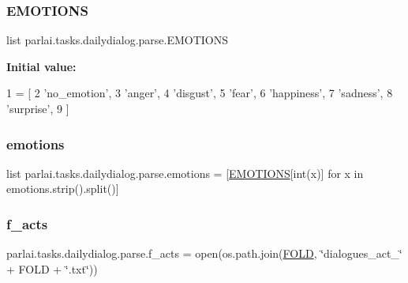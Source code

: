 \subsubsection{\texorpdfstring{E\+M\+O\+T\+I\+O\+NS}{EMOTIONS}}
{\footnotesize\ttfamily list parlai.\+tasks.\+dailydialog.\+parse.\+E\+M\+O\+T\+I\+O\+NS}

{\bfseries Initial value\+:}
\begin{DoxyCode}
1 =  [
2     \textcolor{stringliteral}{'no\_emotion'},
3     \textcolor{stringliteral}{'anger'},
4     \textcolor{stringliteral}{'disgust'},
5     \textcolor{stringliteral}{'fear'},
6     \textcolor{stringliteral}{'happiness'},
7     \textcolor{stringliteral}{'sadness'},
8     \textcolor{stringliteral}{'surprise'},
9 ]
\end{DoxyCode}
\mbox{\label{namespaceparlai_1_1tasks_1_1dailydialog_1_1parse_adfeb415521d435bbc0f876aa2d7c7a76}} 
\subsubsection{\texorpdfstring{emotions}{emotions}}
{\footnotesize\ttfamily list parlai.\+tasks.\+dailydialog.\+parse.\+emotions = \mbox{[}\hyperlink{namespaceparlai_1_1tasks_1_1dailydialog_1_1parse_a4dcf4c3798e88e5b49c655dee367234d}{E\+M\+O\+T\+I\+O\+NS}\mbox{[}int(x)\mbox{]} for x in emotions.\+strip().split()\mbox{]}}

\mbox{\label{namespaceparlai_1_1tasks_1_1dailydialog_1_1parse_a770d23d03169b162728cd3059fb9ac6e}} 
\subsubsection{\texorpdfstring{f\+\_\+acts}{f\_acts}}
{\footnotesize\ttfamily parlai.\+tasks.\+dailydialog.\+parse.\+f\+\_\+acts = open(os.\+path.\+join(\hyperlink{namespaceparlai_1_1tasks_1_1dailydialog_1_1parse_a8c9e030332871e8cb356bcb74c0ddc8c}{F\+O\+LD}, \char`\"{}dialogues\+\_\+act\+\_\+\char`\"{} + F\+O\+LD + \char`\"{}.txt\char`\"{}))}

